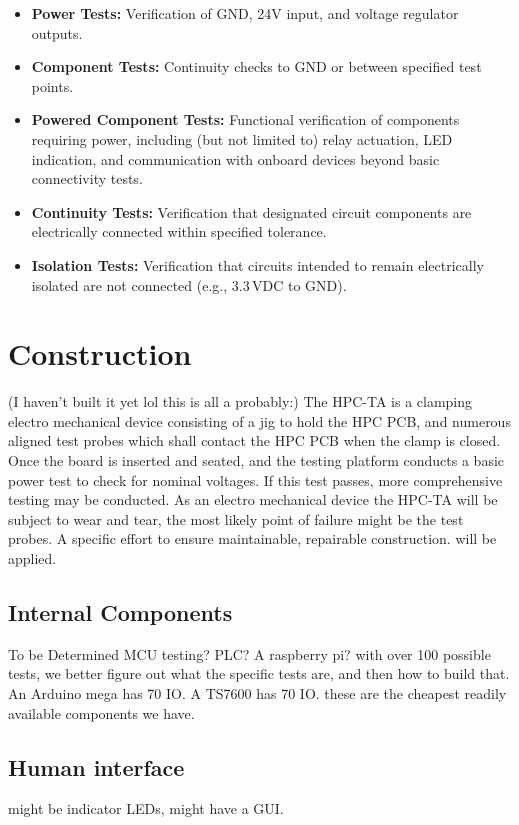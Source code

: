 \documentclass[]{article}
\begin{document}
\begin{itemize}
	\item \textbf{Power Tests:} Verification of GND, 24V input, and voltage regulator outputs.
	
	\item \textbf{Component Tests:} Continuity checks to GND or between specified test points.
	
	\item \textbf{Powered Component Tests:} Functional verification of components requiring power,
	including (but not limited to) relay actuation, LED indication, and communication
	with onboard devices beyond basic connectivity tests.
	
	\item \textbf{Continuity Tests:} Verification that designated circuit components
	are electrically connected within specified tolerance.
	
	\item \textbf{Isolation Tests:} Verification that circuits intended to remain
	electrically isolated are not connected (e.g., 3.3\,VDC to GND).
\end{itemize}
	
	\section*{Construction}
	(I haven't built it yet lol this is all a probably:)
	The HPC-TA is a clamping electro mechanical device consisting of a jig to hold the HPC PCB, and numerous aligned test probes which shall contact the HPC PCB when the clamp is closed. Once the board is inserted and seated, and the testing platform conducts a basic power test to check for nominal voltages. If this test passes, more comprehensive testing may be conducted. As an electro mechanical device the HPC-TA will be subject to wear and tear, the most likely point of failure might be the test probes. A specific effort to ensure maintainable, repairable construction. will be applied. 
	\subsection*{Internal Components}
	To be Determined MCU testing? PLC? A raspberry pi? with over 100 possible tests, we better figure out what the specific tests are, and then how to build that. An Arduino mega has 70 IO. A TS7600 has 70 IO. these are the cheapest readily available components we have. 
	
	\subsection*{Human interface} might be indicator LEDs, might have a GUI. 
	
\end{document}
